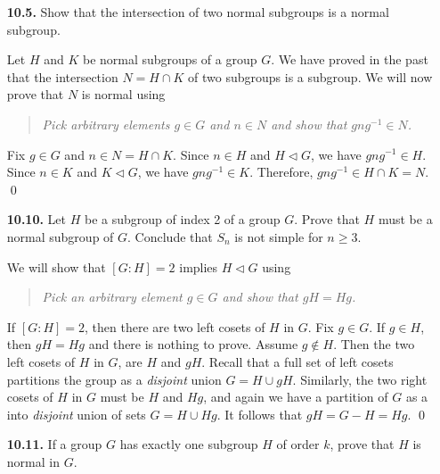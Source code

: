 \documentclass[12pt,reqno]{amsart}
\newcommand{\<}{\ensuremath{\langle}}
\renewcommand{\>}{\ensuremath{\rangle}}
\begin{document}
\begin{enumerate}
\begin{enumerate}
 
\end{enumerate}

\bigskip

\item[{\bf 10.5.}]
Show that the intersection of two normal subgroups is a normal
subgroup. 
 
\medskip
{} Let $H$ and $K$ be normal subgroups of a group $G$.
We have proved in the past that the intersection $N = H\cap K$ of two subgroups
is a subgroup.  We will now prove that $N$ is normal using\\[4pt]
\medskip
\begin{quote}
\emph{Pick arbitrary elements $g\in G$ and $n\in N$ and show that $gng^{-1} \in N$.}
\end{quote}
\medskip
Fix $g\in G$ and $n \in N = H\cap K$.  
Since $n \in H$ and $H \triangleleft G$, we have $gng^{-1} \in H$.
Since $n \in K$ and $K \triangleleft G$, we have $gng^{-1} \in K$.
Therefore, $gng^{-1} \in H\cap K = N$.
\qed
\bigskip

\item[{\bf 10.10.}]
Let $H$ be a subgroup of index 2 of a group $G$. Prove that $H$ must
be a normal subgroup of $G$. Conclude that $S_n$ is not simple for $n \geq 3$.

\medskip
{} We will show that $[G:H]=2$ implies $H\triangleleft G$
using\\[4pt]
\medskip
\begin{quote}
\emph{Pick an arbitrary element $g\in G$ and show that $gH = Hg$.}
\end{quote}
\medskip
If $[G:H]=2$, then there are two left cosets of $H$ in $G$.
Fix $g \in G$. If $g \in H$, then $gH = Hg$ and there is nothing to prove.
Assume $g \notin H$.  Then the two left cosets of $H$ in $G$, 
are $H$ and $gH$. Recall that a full set of left cosets partitions the group as a
\emph{disjoint} union $G = H \cup gH$.  Similarly, the two right cosets of $H$ in
$G$ must be $H$ and $Hg$, and again we have a partition of $G$ as a into
\emph{disjoint} union of sets $G = H \cup Hg$.  It follows that $gH = G-H = Hg$.
\qed

\bigskip

\item[{\bf 10.11.}]
If a group $G$ has exactly one subgroup $H$ of order $k$, prove that
$H$ is normal in $G$. 


\end{enumerate}
\end{document}
